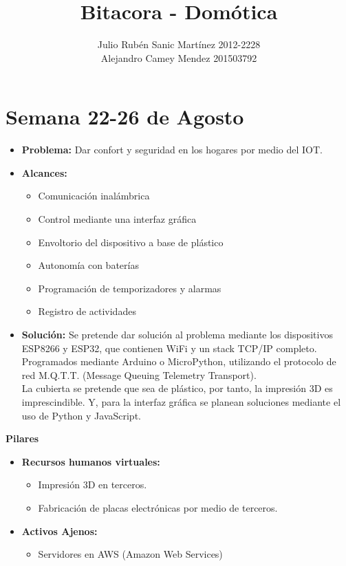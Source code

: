 \documentclass[oneside]{article}
\title{Bitacora - Domótica}
\author{
Julio Rubén Sanic Martínez 2012-2228\\
Alejandro Camey Mendez 201503792
}
\begin{document}
\maketitle

\section*{Semana 22-26 de Agosto}
\begin{itemize}
\item \textbf{Problema:} Dar confort y seguridad en los hogares por medio del IOT.
\item \textbf{Alcances:} 
\begin{itemize}
\item Comunicación inalámbrica
\item Control mediante una interfaz gráfica
\item Envoltorio del dispositivo a base de plástico
\item Autonomía con baterías
\item Programación de temporizadores y alarmas
\item Registro de actividades
\end{itemize} 
\item \textbf{Solución:}
Se pretende dar solución al problema mediante los dispositivos ESP8266 y ESP32, que contienen WiFi y un stack TCP/IP completo. Programados mediante Arduino o MicroPython, utilizando el protocolo de red M.Q.T.T. (Message Queuing Telemetry Transport).
\\
La cubierta se pretende que sea de plástico, por tanto, la impresión 3D es imprescindible. Y, para la interfaz gráfica se planean soluciones mediante el uso de Python y JavaScript.
\end{itemize}
\textbf{\Large Pilares}
\begin{itemize}
\item \textbf{Recursos humanos virtuales:}
\begin{itemize}
\item Impresión 3D en terceros.
\item Fabricación de placas electrónicas por medio de terceros.
\end{itemize}
\item \textbf{Activos Ajenos:}
\begin{itemize}
\item Servidores en AWS (Amazon Web Services)
\end{itemize}
\end{itemize}
\newpage
\end{document}
